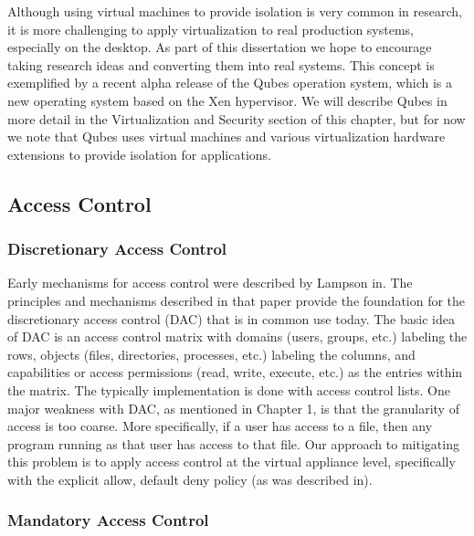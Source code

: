 Although using virtual machines to provide isolation is very common in research, it is more challenging to apply virtualization to real production systems, especially on the desktop. As part of this dissertation we hope to encourage taking research ideas and converting them into real systems. This concept is exemplified by a recent alpha release of the Qubes operation system\cite{qubes-os_2010}, which is a new operating system based on the Xen hypervisor. We will describe Qubes in more detail in the Virtualization and Security section of this chapter, but for now we note that Qubes uses virtual machines and various virtualization hardware extensions to provide isolation for applications.

\subsection{Access Control}

\subsubsection{Discretionary Access Control}

Early mechanisms for access control were described by Lampson in\cite{lampson_accesscontrol_1974}. The principles and mechanisms described in that paper provide the foundation for the discretionary access control (DAC)\cite{sandhu_dac_1994} that is in common use today. The basic idea of DAC is an access control matrix with domains (users, groups, etc.) labeling the rows, objects (files, directories, processes, etc.) labeling the columns, and capabilities or access permissions (read, write, execute, etc.) as the entries within the matrix. The typically implementation is done with access control lists. One major weakness with DAC, as mentioned in Chapter 1, is that the granularity of access is too coarse. More specifically, if a user has access to a file, then any program running as that user has access to that file. Our approach to mitigating this problem is to apply access control at the virtual appliance level, specifically with the explicit allow, default deny policy (as was described in\cite{evanchik_thesis_2004}).

\subsubsection{Mandatory Access Control}

